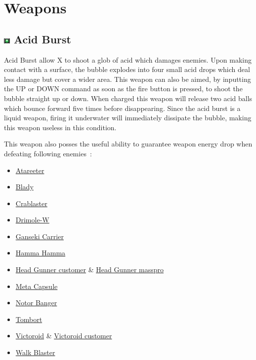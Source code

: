 \section{Weapons}\label{X3:sub_weapon}
\subsection{\includegraphics[width=12px, height=10px]{figures/X3/weapons/A_burst.jpg} Acid Burst}\label{Acid_Burst}
Acid Burst allow X to shoot a glob of acid which damages enemies. Upon making contact with a surface, the bubble explodes into four small acid drops which deal less damage but cover a wider area. This weapon can also be aimed, by inputting the UP or DOWN command as soon as the fire button is pressed, to shoot the bubble straight up or down. When charged this weapon will release two acid balls which bounce forward five times before disappearing. Since the acid burst is a liquid weapon, firing it underwater will immediately dissipate the bubble, making this weapon useless in this condition. 

This weapon also posses the useful ability to guarantee weapon energy drop when defeating following enemies~\cite{X3:enem_drop_gfaqs}:
\begin{itemize}
	\item \hyperlink{enem:Atareeter}{Atareeter}
	\item \hyperlink{enem:Blady}{Blady}
	\item \hyperlink{enem:Crablaster}{Crablaster}
	\item \hyperlink{enem:Drimole-W}{Drimole-W }
	\item \hyperlink{enem:Ganseki_Carrier}{Ganseki Carrier}
	\item \hyperlink{enem:Hamma_Hamma}{Hamma Hamma}
	\item \hyperlink{enem:Head_Gunner_customer}{Head Gunner customer} \& \hyperlink{enem:Head_Gunner_masspro}{Head Gunner masspro}
	\item \hyperlink{enem:Meta_Capsule}{Meta Capsule}
	\item \hyperlink{enem:Notor_Banger}{Notor Banger}
	\item \hyperlink{enem:Tombort}{Tombort}
	\item \hyperlink{enem:Victoroid}{Victoroid} \& \hyperlink{enem:Victoroid_customer}{Victoroid customer}
	\item \hyperlink{enem:Walk Blaster}{Walk Blaster}
\end{itemize}

